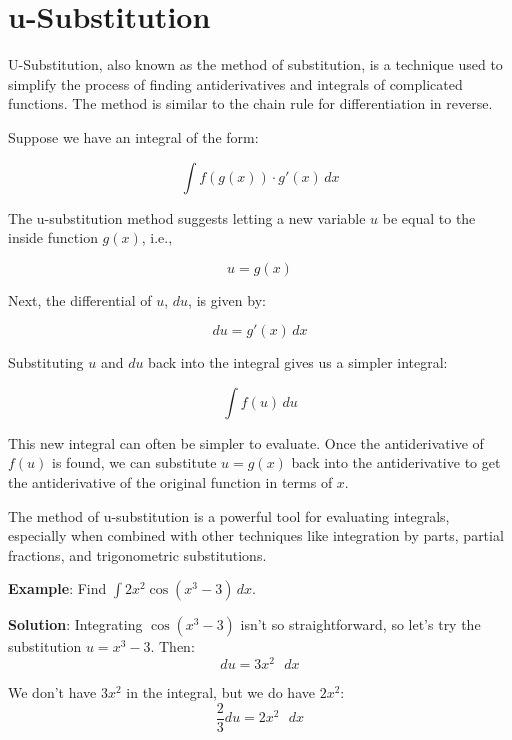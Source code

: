 \chapter{u-Substitution}

U-Substitution, also known as the method of substitution, is a technique used 
to simplify the process of finding antiderivatives and integrals of 
complicated functions. The method is similar to the chain rule for 
differentiation in reverse.

Suppose we have an integral of the form:

\begin{equation}
\int f(g(x)) \cdot g'(x) \, dx
\end{equation}

The u-substitution method suggests letting a new variable $u$ be equal to the inside function $g(x)$, i.e., 

\begin{equation}
u = g(x)
\end{equation}

Next, the differential of $u$, $du$, is given by:

\begin{equation}
du = g'(x) \, dx
\end{equation}

Substituting $u$ and $du$ back into the integral gives us a simpler integral:

\begin{equation}
\int f(u) \, du
\end{equation}

This new integral can often be simpler to evaluate. Once the antiderivative of 
$f(u)$ is found, we can substitute $u=g(x)$ back into the antiderivative to 
get the antiderivative of the original function in terms of $x$.

The method of u-substitution is a powerful tool for evaluating integrals, 
especially when combined with other techniques like integration by parts, 
partial fractions, and trigonometric substitutions.

\textbf{Example}: Find $\int 2 x^2 \cos{ \left( x^3 - 3 \right)}\,dx$.

\textbf{Solution}: Integrating $\cos{ \left( x^3 - 3 \right)}$ isn't so 
straightforward, so let's try the substitution $u = x^3 - 3$. Then:
$$du = 3 x^2 \text{ }dx$$

We don't have $3 x^2$ in the integral, but we do have $2 x^2$:
$$\frac{2}{3} du = 2 x^2 \text{ } dx$$

